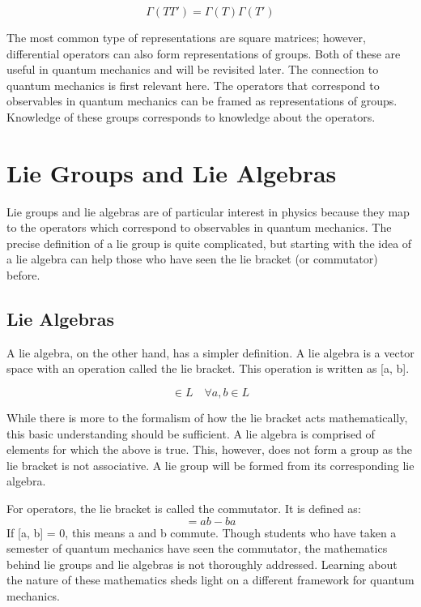 \documentclass{article}
\begin{document}
\begin{equation}
\Gamma (TT') = \Gamma (T) \Gamma (T')
\end{equation}

The most common type of representations are square matrices; however, differential operators can also form representations of groups. Both of these are useful in quantum mechanics and will be revisited later. The connection to quantum mechanics is first relevant here. The operators that correspond to observables in quantum mechanics can be framed as representations of groups. Knowledge of these groups corresponds to knowledge about the operators. 


\section{Lie Groups and Lie Algebras}
Lie groups and lie algebras are of particular interest in physics because they map to the operators which correspond to observables in quantum mechanics. The precise definition of a lie group is quite complicated, but starting with the idea of a lie algebra can help those who have seen the lie bracket (or commutator) before.

\subsection{Lie Algebras}
A lie algebra, on the other hand, has a simpler definition. A lie algebra is a vector space with an operation called the lie bracket. This operation is written as [a, b].

\begin{equation}
[a, b] \in L \quad \forall  a, b \in L
\end{equation}

While there is more to the formalism of how the lie bracket acts mathematically, this basic understanding should be sufficient. A lie algebra is comprised of elements for which the above is true. This, however, does not form a group as the lie bracket is not associative. A lie group will be formed from its corresponding lie algebra.

For operators, the lie bracket is called the commutator. It is defined as:
\begin{equation}
[a, b] = ab - ba
\end{equation} 
If [a, b] = 0, this means a and b commute. Though students who have taken a semester of quantum mechanics have seen the commutator, the mathematics behind lie groups and lie algebras is not thoroughly addressed. Learning about the nature of these mathematics sheds light on a different framework for quantum mechanics.
\end{document}
